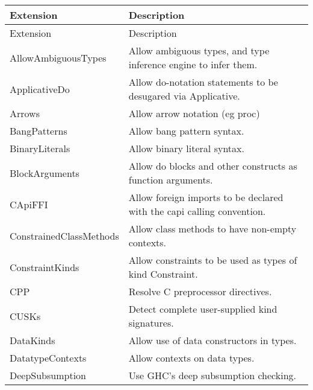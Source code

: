 \documentclass[openany, 12pt]{book}
\begin{document}
\begin{longtable}{ll}
	\toprule
	Extension                  & Description                                                                \\
	\midrule
	\endfirsthead

	\toprule
	Extension                  & Description                                                                \\
	\midrule
	\endhead

	\bottomrule
	\endfoot

	AllowAmbiguousTypes        & Allow ambiguous types, and type inference engine to infer them.            \\
	ApplicativeDo              & Allow do-notation statements to be desugared via Applicative.              \\
	Arrows                     & Allow arrow notation (eg proc)                                             \\
	BangPatterns               & Allow bang pattern syntax.                                                 \\
	BinaryLiterals             & Allow binary literal syntax.                                               \\
	BlockArguments             & Allow do blocks and other constructs as function arguments.                \\
	CApiFFI                    & Allow foreign imports to be declared with the capi calling convention.     \\
	ConstrainedClassMethods    & Allow class methods to have non-empty contexts.                            \\
	ConstraintKinds            & Allow constraints to be used as types of kind Constraint.                  \\
	CPP                        & Resolve C preprocessor directives.                                         \\
	CUSKs                      & Detect complete user-supplied kind signatures.                             \\
	DataKinds                  & Allow use of data constructors in types.                                   \\
	DatatypeContexts           & Allow contexts on data types.                                              \\
	DeepSubsumption            & Use GHC's deep subsumption checking.                                       \\

\end{longtable}
\end{document}
